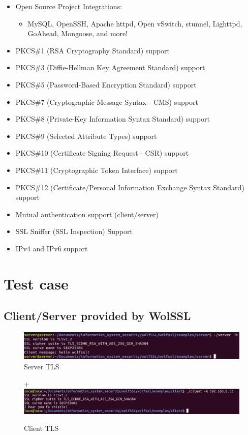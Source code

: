 \documentclass[a4paper,12pt]{article}
\begin{document}
\begin{itemize}
\item Open Source Project Integrations:
\begin{itemize}
\item MySQL, OpenSSH, Apache httpd, Open vSwitch, stunnel, Lighttpd, GoAhead, Mongoose, and more!
\end{itemize}
\item PKCS\#1 (RSA Cryptography Standard) support
\item PKCS\#3 (Diffie-Hellman Key Agreement Standard) support
\item PKCS\#5 (Password-Based Encryption Standard) support
\item PKCS\#7 (Cryptographic Message Syntax - CMS) support
\item PKCS\#8 (Private-Key Information Syntax Standard) support
\item PKCS\#9 (Selected Attribute Types) support
\item PKCS\#10 (Certificate Signing Request - CSR) support
\item PKCS\#11 (Cryptographic Token Interface) support
\item PKCS\#12 (Certificate/Personal Information Exchange Syntax Standard) support
\item Mutual authentication support (client/server)
\item SSL Sniffer (SSL Inspection) Support
\item IPv4 and IPv6 support
\end{itemize}


\section{Test case}
\subsection{Client/Server provided by WolSSL}

\begin{figure}[H]
    \centering
    \includegraphics[scale=0.5]{test/examples/client-server/server.png}
    \caption{Server TLS}
    
\end{figure}


\begin{figure}[H]+
    \centering
    \includegraphics[scale=0.225]{test/examples/client-server/client.png}
    \caption{Client TLS}
    
\end{figure}
\end{document}
